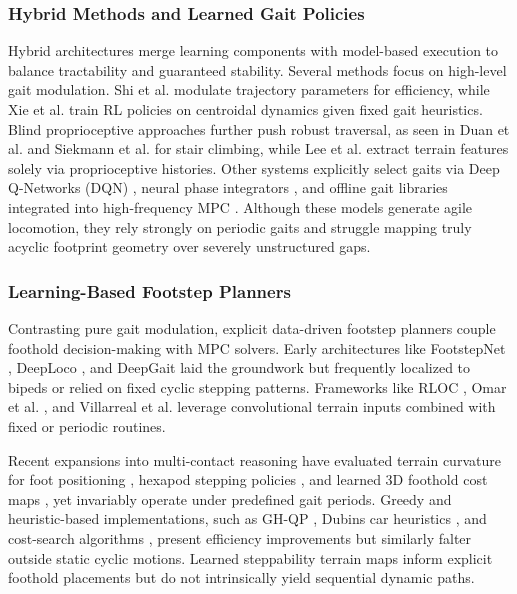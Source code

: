 \subsubsection{Hybrid Methods and Learned Gait Policies}
Hybrid architectures merge learning components with model-based
execution to balance
tractability and guaranteed stability. Several methods focus on
high-level gait modulation.
Shi et al. \cite{shi_terrain-aware_2023} modulate trajectory
parameters for efficiency,
while Xie et al. \cite{xie_glide_2023} train RL policies on
centroidal dynamics given
fixed gait heuristics. Blind proprioceptive approaches further push
robust traversal,
as seen in Duan et al. \cite{duan_sim--real_2022} and Siekmann et al.
\cite{siekmann_blind_2021}
for stair climbing, while Lee et al. \cite{lee_learning_2020} extract
terrain features
solely via proprioceptive histories. Other systems explicitly select
gaits via Deep
Q-Networks (DQN) \cite{da_learning_2020}, neural phase integrators
\cite{yang_fast_2021},
and offline gait libraries integrated into high-frequency MPC
\cite{sun_online_2024}.
Although these models generate agile locomotion, they rely strongly
on periodic gaits
and struggle mapping truly acyclic footprint geometry over severely
unstructured gaps.

\subsubsection{Learning-Based Footstep Planners}
Contrasting pure gait modulation, explicit data-driven footstep
planners couple foothold
decision-making with MPC solvers. Early architectures like
FootstepNet \cite{gaspard_footstepnet_2024},
DeepLoco \cite{peng_deeploco_2017}, and DeepGait
\cite{tsounis_deepgait_2020} laid the groundwork
but frequently localized to bipeds or relied on fixed cyclic stepping
patterns. Frameworks like
RLOC \cite{gangapurwala_rloc_2022}, Omar et al.
\cite{omar_fast_2022}, and Villarreal et al.
\cite{villarreal_fast_2019} leverage convolutional terrain inputs
combined with fixed or periodic routines.

Recent expansions into multi-contact reasoning have evaluated terrain
curvature for foot positioning \cite{tolomei_learning_2025}, hexapod
stepping policies \cite{chen_gait_2024}, and learned 3D foothold cost
maps \cite{meduri_deepq_2021, yao_hierarchical_2021}, yet invariably
operate under predefined gait periods. Greedy and heuristic-based
implementations, such as GH-QP \cite{gao_global_2024}, Dubins car
heuristics \cite{zucker_optimization_2011}, and cost-search
algorithms \cite{kalakrishnan_learning_2011}, present efficiency
improvements but similarly falter outside static cyclic motions.
Learned steppability terrain maps
\cite{asselmeier_steppability-informed_2024, omar_safesteps_2023}
inform explicit foothold placements but do not intrinsically yield
sequential dynamic paths.

